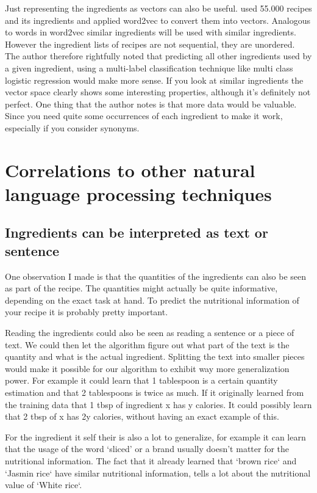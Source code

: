 \documentclass[a4paper]{scrartcl}
\begin{document}
Just representing the ingredients as vectors can also be useful.  used 55.000 recipes and its ingredients and applied word2vec to convert them into vectors. Analogous to words in word2vec similar ingredients will be used with similar ingredients. However the ingredient lists of recipes are not sequential, they are unordered. The author therefore rightfully noted that predicting all other ingredients used by a given ingredient, using a multi-label classification technique like multi class logistic regression would make more sense. If you look at similar ingredients the vector space clearly shows some interesting properties, although it's definitely not perfect. One thing that the author notes is that more data would be valuable. Since you need quite some occurrences of each ingredient to make it work, especially if you consider synonyms. 
\section{Correlations to other natural language processing techniques}
\subsection{Ingredients can be interpreted as text or sentence}
One observation I made is that the quantities of the ingredients can also be seen as part of the recipe.  The quantities might actually be quite informative, depending on the exact task at hand. To predict the nutritional information of your recipe it is probably pretty important.  

Reading the ingredients could also be seen as reading a sentence or a piece of text. We could then let the algorithm figure out what part of the text is the quantity and what is the actual ingredient. Splitting the text into smaller pieces would make it possible for our algorithm to exhibit way more generalization power. For example it could learn that 1 tablespoon is a certain quantity estimation and that 2 tablespoons is twice as much. If it originally learned from the training data that 1 tbsp of ingredient x has y calories. It could possibly  learn that 2 tbsp of x has 2y calories, without having an exact example of this. 

For the ingredient it self their is also a lot to generalize, for example it can learn that the usage of the word `sliced' or a brand usually doesn't matter for the nutritional information. The fact that it already learned that `brown rice` and `Jasmin rice` have similar nutritional information, tells a lot about the nutritional value of `White rice`.
\end{document}
